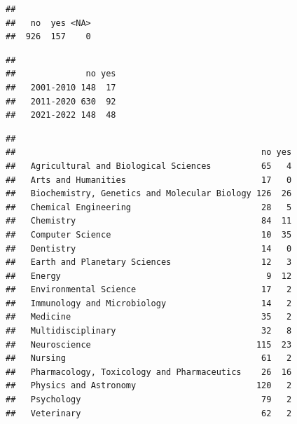 \documentclass[
]{article}
\newenvironment{Shaded}{\begin{snugshade}}{\end{snugshade}}
\newcommand{\CommentTok}[1]{\textcolor[rgb]{0.56,0.35,0.01}{\textit{#1}}}
\newcommand{\FunctionTok}[1]{\textcolor[rgb]{0.00,0.00,0.00}{#1}}
\newcommand{\NormalTok}[1]{#1}
\newcommand{\SpecialCharTok}[1]{\textcolor[rgb]{0.00,0.00,0.00}{#1}}
\begin{document}
\begin{verbatim}
## 
##   no  yes <NA> 
##  926  157    0
\end{verbatim}

\begin{Shaded}
\end{Shaded}

\begin{verbatim}
##            
##              no yes
##   2001-2010 148  17
##   2011-2020 630  92
##   2021-2022 148  48
\end{verbatim}

\begin{Shaded}
\end{Shaded}

\begin{verbatim}
##                                               
##                                                 no yes
##   Agricultural and Biological Sciences          65   4
##   Arts and Humanities                           17   0
##   Biochemistry, Genetics and Molecular Biology 126  26
##   Chemical Engineering                          28   5
##   Chemistry                                     84  11
##   Computer Science                              10  35
##   Dentistry                                     14   0
##   Earth and Planetary Sciences                  12   3
##   Energy                                         9  12
##   Environmental Science                         17   2
##   Immunology and Microbiology                   14   2
##   Medicine                                      35   2
##   Multidisciplinary                             32   8
##   Neuroscience                                 115  23
##   Nursing                                       61   2
##   Pharmacology, Toxicology and Pharmaceutics    26  16
##   Physics and Astronomy                        120   2
##   Psychology                                    79   2
##   Veterinary                                    62   2
\end{verbatim}
\end{document}

